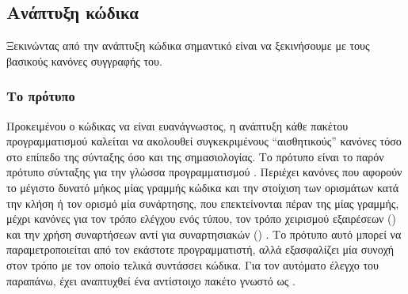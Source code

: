 \subsection{Ανάπτυξη κώδικα}
Ξεκινώντας από την ανάπτυξη κώδικα σημαντικό είναι να ξεκινήσουμε με τους βασικούς κανόνες συγγραφής του.
\subsubsection{Το πρότυπο }
Προκειμένου ο κώδικας να είναι ευανάγνωστος, η ανάπτυξη κάθε πακέτου προγραμματισμού  καλείται να ακολουθεί συγκεκριμένους ``αισθητικούς'' κανόνες τόσο στο επίπεδο της σύνταξης όσο και της σημασιολογίας.
Το πρότυπο  είναι το παρόν πρότυπο σύνταξης για την γλώσσα προγραμματισμού .
Περιέχει κανόνες που αφορούν το μέγιστο δυνατό μήκος μίας γραμμής κώδικα και την στοίχιση των ορισμάτων κατά την κλήση ή τον ορισμό μία συνάρτησης, που επεκτείνονται πέραν της μίας γραμμής, μέχρι κανόνες για τον τρόπο ελέγχου ενός τύπου, τον τρόπο χειρισμού εξαιρέσεων () και την χρήση συναρτήσεων αντί για συναρτησιακών () \cite{PEP8}.
Το πρότυπο αυτό μπορεί να παραμετροποιείται από τον εκάστοτε προγραμματιστή, αλλά εξασφαλίζει μία συνοχή στον τρόπο με τον οποίο τελικά συντάσσει κώδικα.
Για τον αυτόματο έλεγχο του παραπάνω, έχει αναπτυχθεί ένα αντίστοιχο πακέτο γνωστό ως \href{https://pypi.org/project/flake8/}{}.

